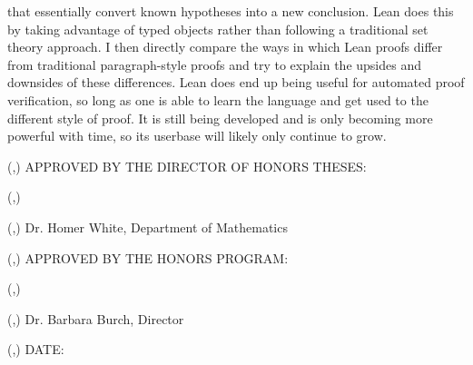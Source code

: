 \documentclass[
  letterpaper,
]{scrreprt}
\theoremstyle{remark}
\begin{document}
\begin{titlepage}
\begin{textblock*}{\textwidth}
that essentially convert known hypotheses into a new conclusion. Lean does this by taking advantage 
of typed objects rather than following a traditional set theory approach. I then directly compare 
the ways in which Lean proofs differ from traditional paragraph-style proofs and try to explain 
the upsides and downsides of these differences. Lean does end up being useful for automated proof 
verification, so long as one is able to learn the language and get used to the different style of 
proof. It is still being developed and is only becoming more powerful with time, so its userbase will 
likely only continue to grow.
\end{textblock*}
\pagebreak
\thispagestyle{empty}
\begin{textblock*}{\paperwidth}(\fromleft{2in},\fromtop{144pt})
APPROVED BY THE DIRECTOR OF HONORS THESES:
\end{textblock*}
\begin{textblock*}{\paperwidth}(\fromleft{3in},\fromtop{192pt})
\underline{\hspace{4.5in}}
\end{textblock*}
\begin{textblock*}{\paperwidth}(\fromleft{3in},\fromtop{216pt})
Dr. Homer White, Department of Mathematics
\end{textblock*}
\begin{textblock*}{\paperwidth}(\fromleft{2in},\fromtop{396pt})
APPROVED BY THE HONORS PROGRAM:
\end{textblock*}
\begin{textblock*}{\paperwidth}(\fromleft{2in},\fromtop{444pt})
\underline{\hspace{4.5in}}
\end{textblock*}
\begin{textblock*}{\paperwidth}(\fromleft{2in},\fromtop{468pt})
Dr. Barbara Burch, Director
\end{textblock*}
\begin{textblock*}{\paperwidth}(\fromleft{1.5in},\fromtop{612pt})
DATE:\underline{\hspace{2in}}
\end{textblock*}
\end{titlepage}%
\theoremstyle{plain}
\newtheorem*{thm}{Theorem}
\newcommand{\thmnm}{Theorem}
\newtheorem*{namedthm}{\thmnm}
\theoremstyle{definition}
\newtheorem*{dfn}{Definition}
\newcommand{\defnm}{Definition}
\newtheorem*{nameddfn}{\defnm}

\newenvironment{nthm}[1]
  {\renewcommand{\thmnm}{#1}\begin{namedthm}}
  {\end{namedthm}}
\end{document}
